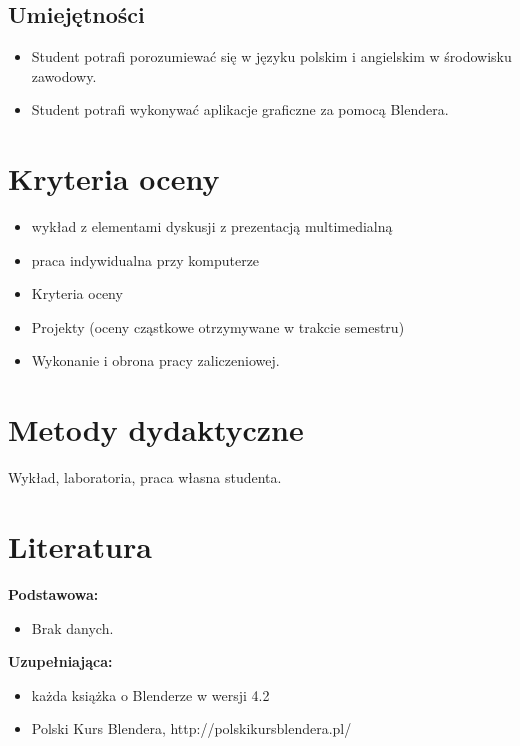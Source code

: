 \documentclass[12pt, a4paper]{article}
\begin{document}
\subsection*{Umiejętności}
\begin{itemize}
  \item Student potrafi  porozumiewać się w języku polskim i angielskim  w środowisku zawodowy.
  \item Student potrafi  wykonywać aplikacje graficzne za pomocą Blendera.
\end{itemize}

\section{Kryteria oceny}

\begin{itemize}
  \item wykład z elementami dyskusji z prezentacją multimedialną
  \item praca indywidualna przy komputerze
  \item Kryteria oceny
  \item Projekty (oceny cząstkowe otrzymywane w trakcie semestru)
  \item Wykonanie i obrona pracy zaliczeniowej.
\end{itemize}

\section{Metody dydaktyczne}

Wykład, laboratoria, praca własna studenta.

\section{Literatura}

\textbf{Podstawowa:}
\begin{itemize}
  \item Brak danych.
\end{itemize}

\textbf{Uzupełniająca:}
\begin{itemize}
  \item każda książka o Blenderze w wersji 4.2
  \item Polski Kurs Blendera, http://polskikursblendera.pl/
\end{itemize}
\end{document}
